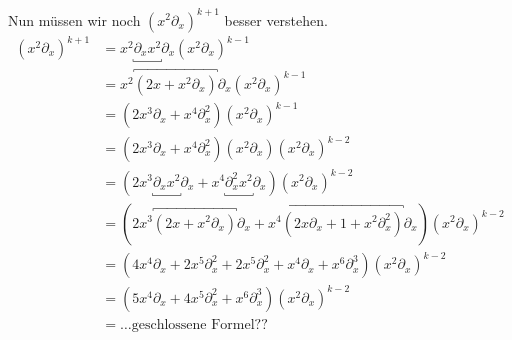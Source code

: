 Nun müssen wir noch $(x^2\partial_x)^{k+1}$ besser verstehen.
\begin{align*}
(x^2\partial_x)^{k+1} &=x^2\underbracket{\partial_xx^2}\partial_x
                        (x^2\partial_x)^{k-1}\\
                      &=x^2\overbracket{(2x+x^{2}\partial_x)}\partial_x
                        (x^2\partial_x)^{k-1}\\
                      &=(2x^3\partial_x+x^{4}\partial_x^2)
                        (x^2\partial_x)^{k-1}\\
                      &=(2x^3\partial_x+x^{4}\partial_x^2)(x^2\partial_x)
                        (x^2\partial_x)^{k-2}\\
                      &=(2x^3\underbracket{\partial_xx^2}\partial_x
                        +x^{4}\underbracket{\partial_x^2x^2}\partial_x)
                        (x^2\partial_x)^{k-2}\\
                      &=(2x^3\overbracket{(2x+x^{2}\partial_x)}\partial_x
                        +x^{4}\overbracket{(2x\partial_x+1+x^2\partial_x^2)}
                        \partial_x) (x^2\partial_x)^{k-2}\\
                      &=(4x^4\partial_x+2x^{5}\partial_x^2
                        +2x^{5}\partial_x^2
                        +x^4\partial_x
                        +x^6\partial_x^3)
                        (x^2\partial_x)^{k-2}\\
                      &=(5x^4\partial_x+4x^{5}\partial_x^2
                        +x^6\partial_x^3)
                        (x^2\partial_x)^{k-2}\\
                      &=\dots \mbox{geschlossene Formel??}
\end{align*}
